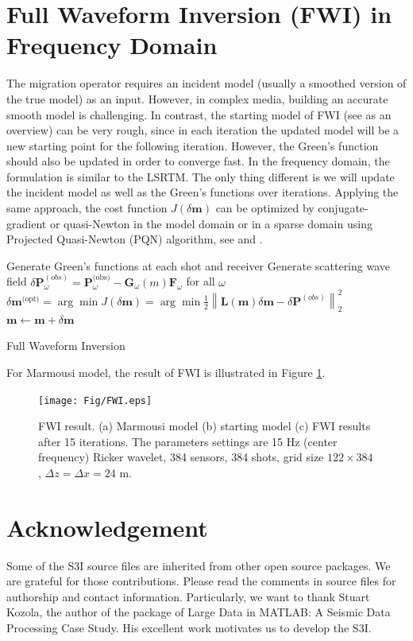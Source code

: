 \documentclass[11pt,titlepage]{article}
\newcommand{\bx}{\boldsymbol{x}}
\newcommand{\bF}{\boldsymbol{F}}
\newcommand{\bG}{\boldsymbol{G}}
\newcommand{\bL}{\boldsymbol{L}}
\newcommand{\bm}{\boldsymbol{m}}
\newcommand{\bP}{\boldsymbol{P}}
\theoremstyle{plain}
\theoremstyle{definition}
\theoremstyle{remark}
\numberwithin{equation}{section}
\begin{document}
\section{Full Waveform Inversion (FWI) in Frequency Domain}
The migration operator requires an incident model (usually a smoothed version of the true model) as an input. However, in complex media, building an accurate smooth model is challenging. In contrast, the starting model of FWI (see \cite{Virieux:2009aa} as an overview) can be very rough, since in each iteration the updated model will be a new starting point for the following iteration. However, the Green's function should also be updated in order to converge fast. In the frequency domain, the formulation is similar to the LSRTM. The only thing different is we will update the incident model as well as the Green's functions over iterations. Applying the same approach, the cost function $J(\delta \bm)$ can be optimized by conjugate-gradient or quasi-Newton in the model domain or in a sparse domain using Projected Quasi-Newton (PQN) algorithm\cite{Schmidt:2009aa}, see  and .

\begin{algorithm}[H]
\begin{algorithmic}[1]
\WHILE{$m(\bx)$ is not converged}
\STATE Generate Green's functions at each shot and receiver
\STATE Generate scattering wave field $\delta\bP^{(obs)}_{\omega}= \bP_{\omega}^{\text{(obs)}} - \bG_{\omega}(m)\bF_{\omega}$ for all $\omega$
\STATE $\delta \bm^{\text{(opt)}} = \arg\min J(\delta \bm) = \arg\min \frac{1}{2} \left\| \bL(\bm)\delta \bm - \delta\bP^{(obs)}\right\|_2^2$
\STATE $\bm \leftarrow \bm + \delta \bm$
\ENDWHILE
\end{algorithmic}
\caption{Full Waveform Inversion}
\end{algorithm}

For Marmousi model, the result of FWI is illustrated in Figure \ref{fig:FWI}.
\begin{figure}[htbp]
\centering
\texttt{[image: Fig/FWI.eps]}
\caption{FWI result. (a) Marmousi model (b) starting model (c) FWI results after 15 iterations. The parameters settings are 15 Hz (center frequency) Ricker wavelet, 384 sensors, 384 shots, grid size $122 \times 384$, $\Delta z = \Delta x = 24$ m.}
\label{fig:FWI}
\end{figure}



\section*{Acknowledgement}
Some of the S3I source files are inherited from other open source packages. We are grateful for those contributions. Please read the comments in source files for authorship and contact information. Particularly, we want to thank Stuart Kozola, the author of the package of Large Data in MATLAB: A Seismic Data Processing Case Study\cite{Kozola:2011aa}. His excellent work motivates us to develop the S3I.  
\end{document}
